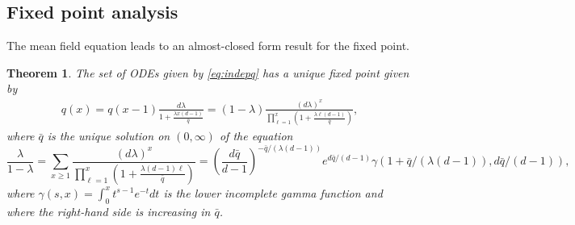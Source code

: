 \documentclass[acmsmall,nonacm]{acmart}
\newtheorem{theorem}{Theorem}
\begin{document}
\subsection{Fixed point analysis}

The mean field equation leads to an almost-closed form result for the fixed point.
\begin{theorem}\label{th:q}
    The set of ODEs given by \eqref{eq:indepq} has a unique fixed point given by
    \begin{align}\label{eq:mf-fixed}
        q(x) = q(x-1) \frac{d\lambda}{1+\frac{\lambda x(d-1)}{\bar q}} =  (1-\lambda) \frac{(d\lambda)^x}{\prod_{\ell = 1}^x (1+\frac{\lambda \ell(d-1)}{\bar q})}, 
    \end{align}
    where $\bar q$ is the unique solution on $(0,\infty)$ of the equation 
    \[
    \frac{\lambda}{1-\lambda}= \sum_{x\geq 1} \frac{(d\lambda)^x}{\prod_{\ell=1}^x (1+\frac{\lambda (d-1) \ell}{\bar q})} =
    \left(\frac{d \bar q}{d-1}\right)^{-\bar q/(\lambda(d-1))} e^{d\bar q/(d-1)} \gamma(1+\bar q/(\lambda (d-1)),d\bar q/(d-1)),\]
where $\gamma(s,x) = \int_0^x t^{s-1} e^{-t} dt$ is the lower incomplete gamma function
and where the right-hand side is increasing in $\bar q$.
\end{theorem}
\end{document}
